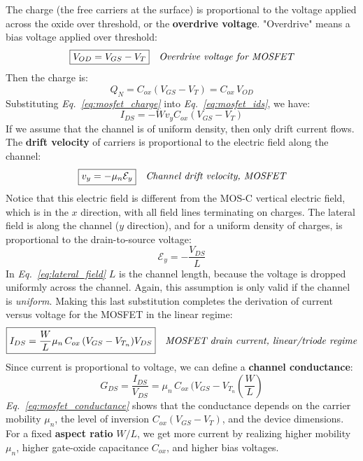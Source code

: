 The charge (the free carriers at the surface) is proportional to the voltage applied across the oxide over threshold, or the \textbf{overdrive voltage}.  "Overdrive" means a bias voltage applied over threshold:
    \begin{align}
        \Aboxed{ V_{OD} &= V_{GS} - V_T } &\textit{Overdrive voltage for MOSFET}
    \end{align}
Then the charge is:
    \begin{equation}
        Q_N = C_{ox}(V_{GS} - V_{T}) = C_{ox}\,V_{OD}
        \label{eq:mosfet_charge}
    \end{equation}
Substituting \emph{Eq.~\ref{eq:mosfet_charge}} into \emph{Eq.~\ref{eq:mosfet_ids}}, we have:
    \begin{equation}
        {I_{DS}} =  - W{v_y}{C_{ox}}({V_{GS}} - {V_{T}})
    \end{equation}
If we assume that the channel is of uniform density, then only drift current flows.  The \textbf{drift velocity} of carriers is proportional to the electric field along the channel:
    \begin{align}
        \Aboxed{ v_y &= -\mu_n\mathcal{E}_y } &\textit{Channel drift velocity, MOSFET}
    \end{align}
Notice that this electric field is different from the MOS-C vertical electric field, which is in the $x$ direction, with all field lines terminating on charges.  The lateral field is along the channel ($y$ direction), and for a uniform density of charges, is proportional to the drain-to-source voltage:
    \begin{equation}
        \mathcal{E}_y = -\frac{V_{DS}}{L}
        \label{eq:lateral_field}
    \end{equation}
In \emph{Eq.~\ref{eq:lateral_field}} $L$ is the channel length, because the voltage is dropped uniformly across the channel.  Again, this assumption is only valid if the channel is \textit{uniform}.  Making this last substitution completes the derivation of current versus voltage for the MOSFET in the linear regime:
    \begin{align}
        \Aboxed{ I_{DS} &= \frac{W}{L}\mu_n\,C_{ox}\,(V_{GS} - V_{T_n})V_{DS} } &\textit{MOSFET drain current, linear/triode regime}
    \end{align}
Since current is proportional to voltage, we can define a \textbf{channel conductance}:
    \begin{equation}
        G_{DS} = \frac{I_{DS}}{V_{DS}} = {\mu_n\,C_{ox}\,(V_{GS} - V_{T_n}} \left( \frac{W}{L} \right)
        \label{eq:mosfet_conductance}
    \end{equation}
\emph{Eq.~\ref{eq:mosfet_conductance}} shows that the conductance depends on the carrier mobility $\mu_n$, the level of inversion $C_{ox}(V_{GS}-V_T)$, and the device dimensions. For a fixed \textbf{aspect ratio} $W/L$, we get more current by realizing higher mobility $\mu_n$, higher gate-oxide capacitance $C_{ox}$, and higher bias voltages.  
